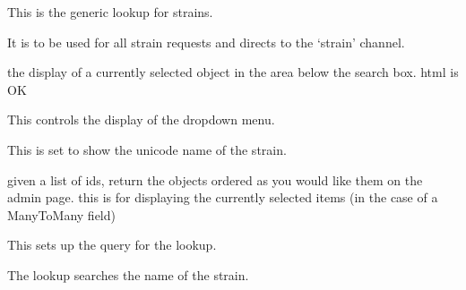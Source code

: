 \documentclass[letterpaper,10pt,english]{sphinxmanual}
\begin{document}

\begin{fulllineitems}
\label{api:experimentdb.reagents.lookups.StrainLookup}
This is the generic lookup for strains.


It is to be used for all strain requests and directs to the `strain' channel.


\begin{fulllineitems}
\label{api:experimentdb.reagents.lookups.StrainLookup.format_item}
the display of a currently selected object in the area below the search box. html is OK


\end{fulllineitems}


\begin{fulllineitems}
\label{api:experimentdb.reagents.lookups.StrainLookup.format_result}
This controls the display of the dropdown menu.


This is set to show the unicode name of the strain.


\end{fulllineitems}


\begin{fulllineitems}
\label{api:experimentdb.reagents.lookups.StrainLookup.get_objects}
given a list of ids, return the objects ordered as you would like them on the admin page.
this is for displaying the currently selected items (in the case of a ManyToMany field)


\end{fulllineitems}


\begin{fulllineitems}
\label{api:experimentdb.reagents.lookups.StrainLookup.get_query}
This sets up the query for the lookup.


The lookup searches the name of the strain.


\end{fulllineitems}


\end{fulllineitems}
\end{document}
